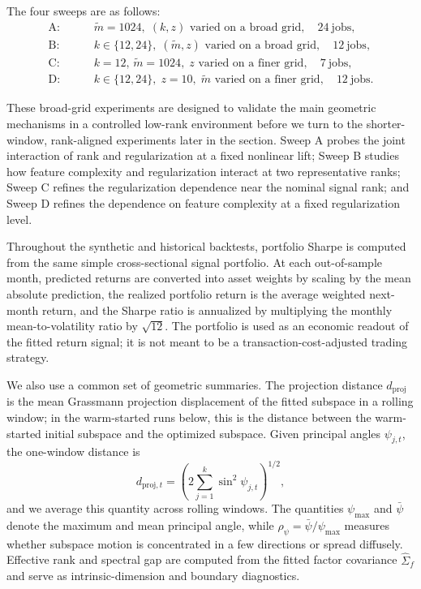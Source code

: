 \documentclass[11pt,letterpaper]{article}
\newcommand{\rhopsi}{\rho_{\psi}}
\newcommand{\dproj}{d_{\mathrm{proj}}}
\begin{document}
The four sweeps are as follows:
\begin{equation*}
\begin{split}
\mathrm{A:}&\qquad \tilde m=1024,\;(k,z)\text{ varied on a broad grid},\quad 24\ \text{jobs},\\
\mathrm{B:}&\qquad k\in\{12,24\},\;(\tilde m,z)\text{ varied on a broad grid},\quad 12\ \text{jobs},\\
\mathrm{C:}&\qquad k=12,\, \tilde m=1024,\; z\text{ varied on a finer grid},\quad 7\ \text{jobs},\\
\mathrm{D:}&\qquad k\in\{12,24\},\; z=10,\; \tilde m\text{ varied on a finer grid},\quad 12\ \text{jobs}.
\end{split}
\end{equation*}

These broad-grid experiments are designed to validate the main geometric mechanisms in a controlled low-rank environment before we turn to the shorter-window, rank-aligned experiments later in the section. Sweep A probes the joint interaction of rank and regularization at a fixed nonlinear lift; Sweep B studies how feature complexity and regularization interact at two representative ranks; Sweep C refines the regularization dependence near the nominal signal rank; and Sweep D refines the dependence on feature complexity at a fixed regularization level.

Throughout the synthetic and historical backtests, portfolio Sharpe is computed from the same simple cross-sectional signal portfolio. At each out-of-sample month, predicted returns are converted into asset weights by scaling by the mean absolute prediction, the realized portfolio return is the average weighted next-month return, and the Sharpe ratio is annualized by multiplying the monthly mean-to-volatility ratio by $\sqrt{12}$. The portfolio is used as an economic readout of the fitted return signal; it is not meant to be a transaction-cost-adjusted trading strategy.

We also use a common set of geometric summaries. The projection distance $\dproj$ is the mean Grassmann projection displacement of the fitted subspace in a rolling window; in the warm-started runs below, this is the distance between the warm-started initial subspace and the optimized subspace. Given principal angles $\psi_{j,t}$, the one-window distance is
\begin{equation*}
d_{\mathrm{proj},t}
=
\left(2\sum_{j=1}^k \sin^2 \psi_{j,t}\right)^{1/2},
\end{equation*}
and we average this quantity across rolling windows. The quantities $\psi_{\max}$ and $\bar\psi$ denote the maximum and mean principal angle, while $\rhopsi=\bar\psi/\psi_{\max}$ measures whether subspace motion is concentrated in a few directions or spread diffusely. Effective rank and spectral gap are computed from the fitted factor covariance $\hat\Sigma_f$ and serve as intrinsic-dimension and boundary diagnostics.
\end{document}

